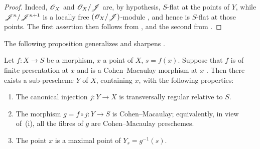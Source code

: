 \begin{proof}
Indeed, $\mathscr{O}_X$ and $\mathscr{O}_X/\mathscr{J}$ are, by hypothesis, $S$-flat at the points of $Y$, while $\mathscr{J}^n/\mathscr{J}^{n+1}$ is a locally free $(\mathscr{O}_X/\mathscr{J})$-module , and hence is $S$-flat at those points.
The first assertion then follows from , and the second from .
\end{proof}

The following proposition generalizes and sharpens .

\begin{proposition}[19.2.9]
\label{IV.19.2.9}
Let $f:X\to S$ be a morphism, $x$ a point of $X$, $s=f(x)$.
Suppose that $f$ is of finite presentation at $x$ and is a Cohen--Macaulay morphism at $x$ .
Then there exists a sub-prescheme $Y$ of $X$, containing $x$, with the following properties:
\begin{enumerate}[label=\textup{(\roman*)}]
  \item The canonical injection $j:Y\to X$ is transversally regular relative to $S$.
  \item The morphism $g=f\circ j:Y\to S$ is Cohen--Macaulay; equivalently, in view of~(i), all the fibres of $g$ are Cohen--Macaulay preschemes.
  \item The point $x$ is a maximal point of $Y_s=g^{-1}(s)$.
\end{enumerate}
\end{proposition}


